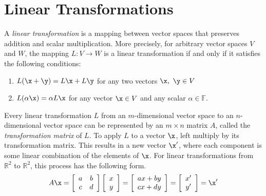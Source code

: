 
\section*{Linear Transformations} %


A \emph{linear transformation} is a mapping between vector spaces that preserves addition and scalar multiplication.
More precisely, for arbitrary vector spaces $V$ and $W$, the mapping $L:V\rightarrow W$ is a linear transformation if and only if it satisfies the following conditions:
%
\begin{enumerate}
\item $L(\x + \y) = L\x + L\y$ for any two vectors $\x,\ \y \in V$
\item $L(\alpha\x) = \alpha L\x$ for any vector $\x \in V$ and any scalar $\alpha \in \mathbb{F}$.
\end{enumerate}

Every linear transformation $L$ from an $m$-dimensional vector space to an $n$-dimensional vector space can be represented by an $m\times n$ matrix $A$, called the \emph{transformation matrix} of $L$.
To apply $L$ to a vector $\x$, left multiply by its transformation matrix.
This results in a new vector $\x^\prime$, where each component is some linear combination of the elements of $\x$.
For linear transformations from $\mathbb{R}^2$ to $\mathbb{R}^2$, this process has the following form.
%
\begin{align*}
A\x =
\left[\begin{array}{cc}
a & b \\
c & d \\
\end{array}\right]
\left[\begin{array}{c}
x\\y
\end{array}\right]
=
\left[\begin{array}{cc}
ax + by \\cx + dy
\end{array}\right]
=
\left[\begin{array}{cc}
x^\prime \\y^\prime
\end{array}\right]
= \x^\prime
\end{align*}

